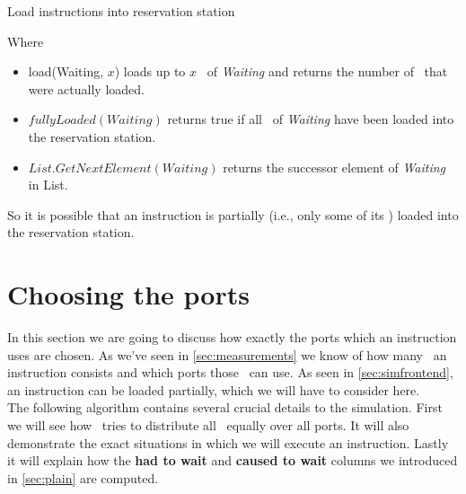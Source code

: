 \begin{algorithm}[H]
    \SetAlgoLined
    \caption{Load instructions into reservation station}
\end{algorithm}

Where
\begin{itemize}
    \item load\microops(Waiting, $x$) loads up to $x$ \microops\ of \emph{Waiting} and returns the number of \microops\ that were actually loaded.
    \item $fullyLoaded(Waiting)$ returns true if all \microops\ of \emph{Waiting} have been loaded into the reservation station.
    \item $List.GetNextElement(Waiting)$ returns the successor element of \emph{Waiting} in List.
\end{itemize}

So it is possible that an instruction is partially (i.e., only some of its \microops) loaded into the reservation station.

\section{Choosing the ports}
\label{sec:chooseport}

In this section we are going to discuss how exactly the ports which an instruction uses are chosen. As we've seen in \autoref{sec:measurements} we know of how many \microops\ an instruction consists and which ports those \microops\ can use. As seen in \autoref{sec:simfrontend}, an instruction can be loaded partially, which we will have to consider here.\\
The following algorithm contains several crucial details to the simulation. First we will see how \suaca\ tries to distribute all \microops\ equally over all ports. It will also demonstrate the exact situations in which we will execute an instruction. Lastly it will explain how the \textbf{had to wait} and \textbf{caused to wait} columns we introduced in \autoref{sec:plain} are computed. 
\newpage


